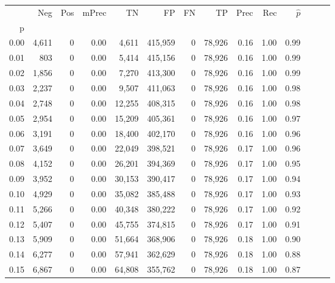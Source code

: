 \begin{tabular}{rrrrrrrrrrrrrr}
\toprule
{} &    Neg &    Pos & mPrec &       TN &       FP &      FN &      TP &  Prec &   Rec & $\hat{p}$ \\
p    &        &        &       &          &          &         &         &       &       &           \\
\midrule
0.00 &  4,611 &      0 &  0.00 &    4,611 &  415,959 &       0 &  78,926 &  0.16 &  1.00 &      0.99 \\
0.01 &    803 &      0 &  0.00 &    5,414 &  415,156 &       0 &  78,926 &  0.16 &  1.00 &      0.99 \\
0.02 &  1,856 &      0 &  0.00 &    7,270 &  413,300 &       0 &  78,926 &  0.16 &  1.00 &      0.99 \\
0.03 &  2,237 &      0 &  0.00 &    9,507 &  411,063 &       0 &  78,926 &  0.16 &  1.00 &      0.98 \\
0.04 &  2,748 &      0 &  0.00 &   12,255 &  408,315 &       0 &  78,926 &  0.16 &  1.00 &      0.98 \\
0.05 &  2,954 &      0 &  0.00 &   15,209 &  405,361 &       0 &  78,926 &  0.16 &  1.00 &      0.97 \\
0.06 &  3,191 &      0 &  0.00 &   18,400 &  402,170 &       0 &  78,926 &  0.16 &  1.00 &      0.96 \\
0.07 &  3,649 &      0 &  0.00 &   22,049 &  398,521 &       0 &  78,926 &  0.17 &  1.00 &      0.96 \\
0.08 &  4,152 &      0 &  0.00 &   26,201 &  394,369 &       0 &  78,926 &  0.17 &  1.00 &      0.95 \\
0.09 &  3,952 &      0 &  0.00 &   30,153 &  390,417 &       0 &  78,926 &  0.17 &  1.00 &      0.94 \\
0.10 &  4,929 &      0 &  0.00 &   35,082 &  385,488 &       0 &  78,926 &  0.17 &  1.00 &      0.93 \\
0.11 &  5,266 &      0 &  0.00 &   40,348 &  380,222 &       0 &  78,926 &  0.17 &  1.00 &      0.92 \\
0.12 &  5,407 &      0 &  0.00 &   45,755 &  374,815 &       0 &  78,926 &  0.17 &  1.00 &      0.91 \\
0.13 &  5,909 &      0 &  0.00 &   51,664 &  368,906 &       0 &  78,926 &  0.18 &  1.00 &      0.90 \\
0.14 &  6,277 &      0 &  0.00 &   57,941 &  362,629 &       0 &  78,926 &  0.18 &  1.00 &      0.88 \\
0.15 &  6,867 &      0 &  0.00 &   64,808 &  355,762 &       0 &  78,926 &  0.18 &  1.00 &      0.87 \\

\end{tabular}
